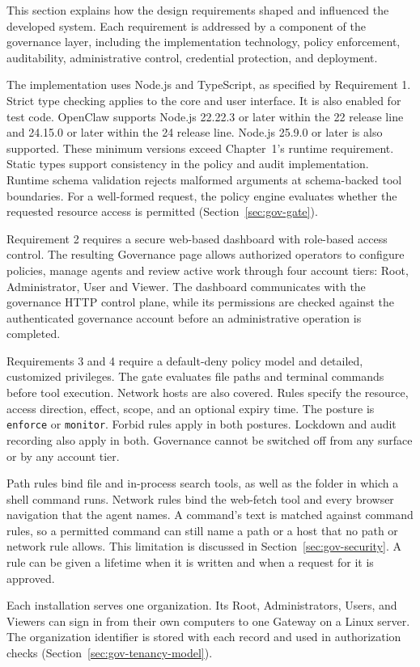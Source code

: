 This section explains how the design requirements shaped and influenced the developed system.
Each requirement is addressed by a component of the governance layer, including the
implementation technology, policy enforcement, auditability,
administrative control, credential protection, and deployment.

{\color{red}The implementation uses Node.js and TypeScript, as specified by
Requirement 1. Strict type checking applies to the core and user interface.
It is also enabled for test code. OpenClaw supports Node.js 22.22.3 or later
within the 22 release line and 24.15.0 or later within the 24 release line.
Node.js 25.9.0 or later is also supported. These minimum versions exceed
Chapter~1's runtime requirement. Static types support consistency in the
policy and audit implementation. Runtime schema validation rejects malformed
arguments at schema-backed tool boundaries. For a well-formed request, the
policy engine evaluates whether the requested resource access is permitted
(Section~\ref{sec:gov-gate}).}

Requirement 2 requires a secure web-based dashboard with role-based access
control. The resulting Governance page allows authorized operators to configure
policies, manage agents and review active work through four account tiers: Root,
Administrator, User and Viewer. The dashboard communicates with the governance
HTTP control plane, while its permissions are checked against the authenticated
governance account before an administrative operation is completed.

{\color{red}Requirements 3 and 4 require a default-deny policy model and detailed,
customized privileges. The gate evaluates file paths and terminal commands
before tool execution. Network hosts are also covered. Rules specify the resource, access
direction, effect, scope, and an optional expiry time. The posture is
\texttt{enforce} or \texttt{monitor}. Forbid rules apply in both postures.
Lockdown and audit recording also apply in both. Governance cannot be
switched off from any surface or by any account tier.

Path rules bind file and in-process search tools, as well as the folder in
which a shell command runs. Network rules bind the web-fetch tool and every
browser navigation that the agent names. A command's text is matched against command rules, so a
permitted command can still name a path or a host that no path or network rule
allows. This limitation is discussed in Section~\ref{sec:gov-security}. A rule can
be given a lifetime when it is written and when a request for it is approved.

Each installation serves one organization. Its Root, Administrators, Users,
and Viewers can sign in from their own computers to one Gateway on a Linux
server. The organization identifier is stored with each record and used in
authorization checks
(Section~\ref{sec:gov-tenancy-model}).}

